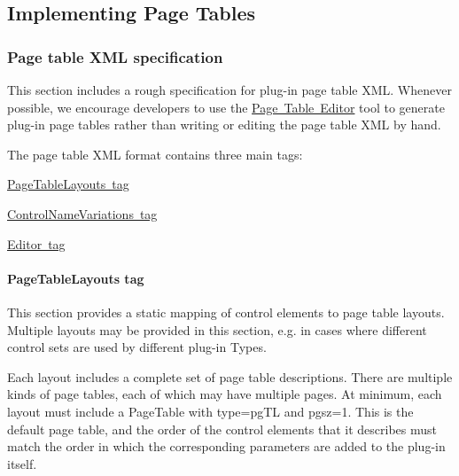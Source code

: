  \hypertarget{a00833_aax_page_table_guide_05_implementing_page_tables}{}\subsection{Implementing Page Tables}\label{a00833_aax_page_table_guide_05_implementing_page_tables}
\hypertarget{a00833_subsection_page_table_xml_specification}{}\subsubsection{Page table X\+M\+L specification}\label{a00833_subsection_page_table_xml_specification}
This section includes a rough specification for plug-\/in page table X\+ML. Whenever possible, we encourage developers to use the \mbox{\hyperlink{a00833_subsection_creating_page_tables_in_pete}{Page Table Editor}} tool to generate plug-\/in page tables rather than writing or editing the page table X\+ML by hand.

The page table X\+ML format contains three main tags\+:


\begin{DoxyItemize}
\item \mbox{\hyperlink{a00833_subsubsection_pagetablelayouts_tag}{Page\+Table\+Layouts tag}}
\item \mbox{\hyperlink{a00833_subsubsection_controlnamesvariations_tag}{Control\+Name\+Variations tag}}
\item \mbox{\hyperlink{a00833_subsubsection_editor_tag}{Editor tag}}
\end{DoxyItemize}

\hypertarget{a00833_subsubsection_pagetablelayouts_tag}{}\paragraph{Page\+Table\+Layouts tag}\label{a00833_subsubsection_pagetablelayouts_tag}
This section provides a static mapping of control elements to page table layouts. Multiple layouts may be provided in this section, e.\+g. in cases where different control sets are used by different plug-\/in Types.

Each layout includes a complete set of page table descriptions. There are multiple kinds of page tables, each of which may have multiple pages. At minimum, each layout must include a {\ttfamily Page\+Table} with {\ttfamily type=\textquotesingle{}pg\+TL\textquotesingle{}} and {\ttfamily pgsz=\textquotesingle{}1\textquotesingle{}}. This is the default page table, and the order of the control elements that it describes must match the order in which the corresponding parameters are added to the plug-\/in itself.

